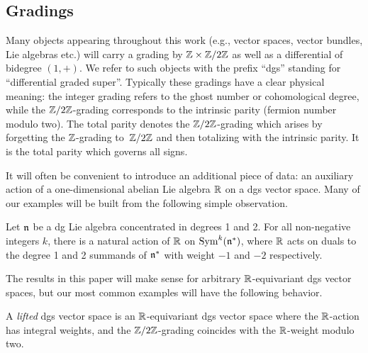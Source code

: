 \documentclass[11pt]{article}
\numberwithin{equation}{section}
\numberwithin{equation}{section}
\DeclareMathOperator{\Sym}{Sym}
\begin{document}
\subsection{Gradings}
\label{ssec:gradings}
Many objects appearing throughout this work (e.g., vector spaces, vector bundles, Lie algebras etc.) will carry a grading by $\mathbb Z\times \mathbb Z/2\mathbb Z$ as well as a differential of bidegree $(1,+)$. We refer to such objects with the prefix ``dgs'' standing for ``differential graded super''. Typically these gradings have a clear physical meaning: the integer grading refers to the ghost number or cohomological degree, while the $\mathbb Z/2\mathbb Z$-grading corresponds to the intrinsic parity (fermion number modulo two). The total parity denotes the $\mathbb Z/2\mathbb Z$-grading which arises by forgetting the $\mathbb Z$-grading to~$\mathbb Z/2\mathbb Z$ and then totalizing with the intrinsic parity. It is the total parity which governs all signs.

It will often be convenient to introduce an additional piece of data: an auxiliary action of a one-dimensional abelian Lie algebra $\mathbb R$ on a dgs vector space. Many of our examples will be built from the following simple observation.

\begin{eg}
	Let $\mathfrak n$ be a dg Lie algebra concentrated in degrees 1 and 2. For all non-negative integers $k$, there is a natural action of $\mathbb R$ on $\Sym^k(\fn^*)$, where $\mathbb R$ acts on duals to the degree 1 and 2 summands of $\mathfrak n^*$ with weight $-1$ and $-2$ respectively.
\end{eg}

The results in this paper will make sense for arbitrary $\mathbb R$-equivariant dgs vector spaces, but our most common examples will have the following behavior.

\begin{dfn}
	A \emph{lifted} dgs vector space is an $\mathbb R$-equivariant dgs vector space where the $\mathbb R$-action has integral weights, and the $\mathbb Z/2\mathbb Z$-grading coincides with the $\mathbb R$-weight modulo two.
\end{dfn}
\end{document}
